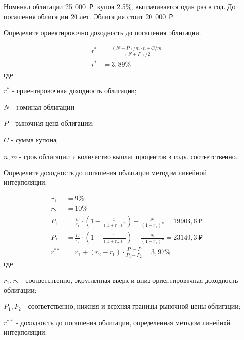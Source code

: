\documentclass[12pt, table]{exam}
\begin{document}
\begin{questions}
\begin{subparts}
\begin{solution}[12em]
	\end{solution}
\end{subparts}
\addpoints

\pagebreak
\question[20] Номинал облигации 25~000~₽, купон 2.5\%, выплачивается один раз в год. До погашения облигации 20 лет. Облигация стоит 20~000~₽. 
\noaddpoints
\begin{subparts}
	\subpart[10] Определите ориентировочно доходность до погашения облигации.
	\begin{solution}[12em]
		\begin{align*}
		r^*&=\frac{(N-P)/m \cdot n + C/m }{(N+P)/2}\\
		r^*&=3,89\%
		\end{align*}
		где
		
		$r^*$ - ориентировочная доходность облигации;
		
		$N$ - номинал облигации;
		
		$P$ - рыночная цена облигации;
		
		$C$ - сумма купона;
		
		$n, m$ - срок облигации и количество выплат процентов в году, соответственно.
	\end{solution}
	
	\subpart[10] Определите доходность до погашения облигации методом линейной интерполяции.
	
	\begin{solution}[12em]
		\begin{align*}
		r_1&=9\%\\
		r_2&=10\%\\
		P_1&=\frac{C}{r_1} \cdot \left(1 - \frac{1}{(1+r_1)^n} \right) + \frac{N}{(1+r_1)^n}=19903,6~₽\\
		P_2&=\frac{C}{r_2} \cdot \left(1 - \frac{1}{(1+r_2)^n} \right) + \frac{N}{(1+r_1)^n}=23140,3~₽\\
		r^{**}&=r_1+(r_2-r_1) \cdot \frac{P_1-P}{P_1-P_2}=3,97\%
		\end{align*}	
		где
		
		$r_1, r_2$ - соответственно, округленная вверх и вниз ориентировочная доходность облигации;
		
		$P_1, P_2$ - соответственно, нижняя и верхняя границы рыночной цены облигации;
		
		$r^{**}$ - доходность до погашения облигации, определенная методом линейной интерполяции.
	\end{solution}
	
\end{subparts}
\addpoints


\end{questions}
\end{document}
